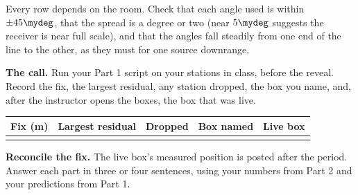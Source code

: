 \documentclass{exam}
\newif\ifkey
\newcommand{\kv}[1]{\ifkey{\color{red}#1}\fi\rule[-0.10in]{0pt}{0.34in}}
\begin{document}
\begin{questions}
\begin{solution}
Every row depends on the room. Check that each angle used is within
$\pm 45\mydeg$, that the spread is a degree or two (near $5\mydeg$ suggests the
receiver is near full scale), and that the angles fall steadily from one end of
the line to the other, as they must for one source downrange.
\end{solution}

\question \textbf{The call.} Run your Part 1 script on your stations in class,
before the reveal. Record the fix, the largest residual, any station dropped, the
box you name, and, after the instructor opens the boxes, the box that was live.

\begin{center}
\renewcommand{\arraystretch}{1.25}
\begin{tabular}{| K{1.1in} | K{1.0in} | K{0.9in} | K{0.9in} | K{0.9in} |}
\hline
\textbf{Fix (m)} & \textbf{Largest residual} & \textbf{Dropped} & \textbf{Box named} & \textbf{Live box} \\\hline\hline
\kv{} & \kv{$\lesssim 0.15\ \m$} & \kv{} & \kv{} & \kv{} \\\hline
\end{tabular}
\end{center}

\newpage
{}

\question \textbf{Reconcile the fix.} The live box's measured position is posted
after the period. Answer each part in three or four sentences, using your numbers
from Part 2 and your predictions from Part 1.

\end{questions}
\end{document}
